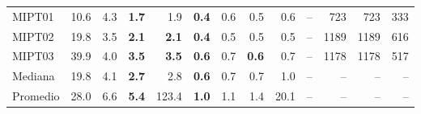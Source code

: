 \begin{table}[!htbp]
\begin{tabular}{l rrrr | rrrr | rrrr}
MIPT01 & 10.6 & 4.3 & \textbf{1.7} & 1.9 & \textbf{0.4} & 0.6 & 0.5 & 0.6 & -- & 723 & 723 & 333 \\
MIPT02 & 19.8 & 3.5 & \textbf{2.1} & \textbf{2.1} & \textbf{0.4} & 0.5 & 0.5 & 0.5 & -- & 1189 & 1189 & 616 \\
MIPT03 & 39.9 & 4.0 & \textbf{3.5} & \textbf{3.5} & \textbf{0.6} & 0.7 & \textbf{0.6} & 0.7 & -- & 1178 & 1178 & 517 \\
\midrule
Mediana & 19.8 & 4.1 & \textbf{2.7} & 2.8 & \textbf{0.6} & 0.7 & 0.7 & 1.0 & -- & -- & -- & -- \\
Promedio & 28.0 & 6.6 & \textbf{5.4} & 123.4 & \textbf{1.0} & 1.1 & 1.4 & 20.1 & -- & -- & -- & -- \\
\bottomrule
\end{tabular}
\end{table}

